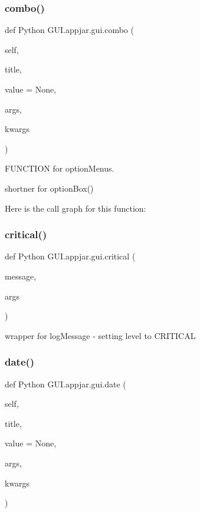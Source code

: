 \subsubsection{\texorpdfstring{combo()}{combo()}}
{\footnotesize\ttfamily def Python G\+U\+I.\+appjar.\+gui.\+combo (\begin{DoxyParamCaption}\item[{}]{self,  }\item[{}]{title,  }\item[{}]{value = {\ttfamily None},  }\item[{}]{args,  }\item[{}]{kwargs }\end{DoxyParamCaption})}



F\+U\+N\+C\+T\+I\+ON for option\+Menus. 

\begin{DoxyVerb}shortner for optionBox() \end{DoxyVerb}
 Here is the call graph for this function\+:
\mbox{\label{class_python_01_g_u_i_1_1appjar_1_1gui_a0a55aa1047f6ddf5745e80d7daa298e2}} 
\subsubsection{\texorpdfstring{critical()}{critical()}}
{\footnotesize\ttfamily def Python G\+U\+I.\+appjar.\+gui.\+critical (\begin{DoxyParamCaption}\item[{}]{message,  }\item[{}]{args }\end{DoxyParamCaption})\hspace{0.3cm}{\ttfamily [static]}}

\begin{DoxyVerb}wrapper for logMessage - setting level to CRITICAL \end{DoxyVerb}
 \mbox{\label{class_python_01_g_u_i_1_1appjar_1_1gui_aaf78746829437a637aad1f56fa01efd1}} 
\subsubsection{\texorpdfstring{date()}{date()}}
{\footnotesize\ttfamily def Python G\+U\+I.\+appjar.\+gui.\+date (\begin{DoxyParamCaption}\item[{}]{self,  }\item[{}]{title,  }\item[{}]{value = {\ttfamily None},  }\item[{}]{args,  }\item[{}]{kwargs }\end{DoxyParamCaption})}



